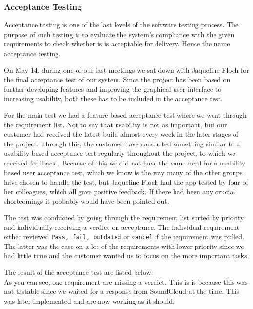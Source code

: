 \subsubsection{Acceptance Testing}
Acceptance testing is one of the last levels of the software testing process. The purpose of such testing is to evaluate the system's compliance with the given requirements to check whether is is acceptable for delivery. Hence the name acceptance testing.

On May 14. during one of our last meetings we sat down with Jaqueline Floch for the final acceptance test of our system. Since the project has been based on further developing features and improving the graphical user interface to increasing usability, both these has to be included in the acceptance test.

For the main test we had a feature based acceptance test where we went through the requirement list. Not to say that usability is not as important, but our customer had received the latest build almost every week in the later stages of the project. Through this, the customer have conducted something similar to a usability based acceptance test regularly throughout the project, to which we received feedback . Because of this we did not have the same need for a usability based user acceptance test, which we know is the way many of the other groups have chosen to handle the test, but Jaqueline Floch had the app tested by four of her colleagues, which all gave positive feedback. If there had been any crucial shortcomings it probably would have been pointed out.

The test was conducted by going through the requirement list sorted by priority and individually receiving a verdict on acceptance. The individual requirement either reviewed \texttt{Pass, fail, outdated} or \texttt{cancel} if the requirement was pulled. The latter was the case on a lot of the requirements with lower priority since we had little time and the customer wanted us to focus on the more important tasks.

The result of the acceptance test are listed below:\\



As you can see, one requirement are missing a verdict. This is is because this was not testable since we waited for a response from SoundCloud at the time. This was later implemented and are now working as it should.


